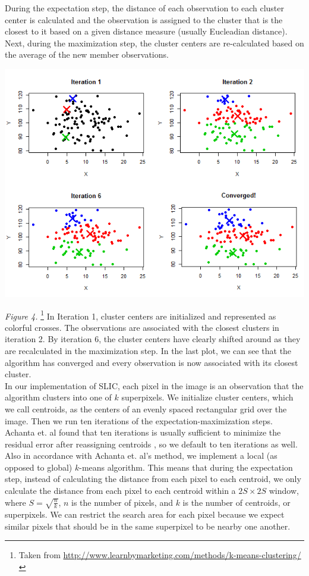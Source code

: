 \documentclass[11pt,twocolumn]{article}
\begin{document}
During the expectation step, the distance of each observation to each cluster center is calculated and the observation is assigned to the cluster that is the closest to it based on a given distance measure (usually Eucleadian distance). Next, during the maximization step, the cluster centers are re-calculated based on the average of the new member observations.

\begin{center}
\includegraphics[width = \linewidth]{kmeans_example_cropped.png} \\ 
\end{center}
\textit{Figure 4.} \footnote{Taken from \url{http://www.learnbymarketing.com/methods/k-means-clustering/} } In Iteration 1, cluster centers are initialized and represented as colorful crosses. The observations are associated with the closest clusters in iteration 2. By iteration 6, the cluster centers have clearly shifted around as they are recalculated in the maximization step. In the last plot, we can see that the algorithm has converged and every observation is now associated with its closest cluster. \\

In our implementation of SLIC, each pixel in the image is an observation that the algorithm clusters into one of $k$ superpixels. We initialize cluster centers, which we call centroids, as the centers of an evenly spaced rectangular grid over the image. Then we run ten iterations of the expectation-maximization steps. Achanta et. al found that ten iterations is usually sufficient to minimize the residual error after reassigning centroids \cite{slic}, so we default to ten iterations as well. Also in accordance with Achanta et. al's method, we implement a local (as opposed to global) $k$-means algorithm. This means that during the expectation step, instead of calculating the distance from each pixel to each centroid, we only calculate the distance from each pixel to each centroid within a $2S \times 2S$ window, where $S = \sqrt{\frac{n}{k}}$, $n$ is the number of pixels, and $k$ is the number of centroids, or superpixels. We can restrict the search area for each pixel because we expect similar pixels that should be in the same superpixel to be nearby one another. 
\end{document}
